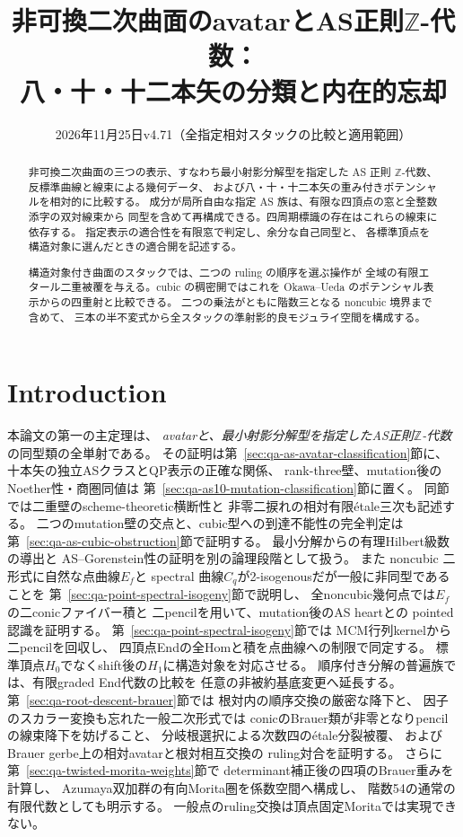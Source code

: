 \documentclass[a4paper,11pt]{ltjsarticle}
\title{非可換二次曲面のavatarとAS正則$\mathbb Z$-代数：\\
  八・十・十二本矢の分類と内在的忘却}
\author{}
\date{2026年11月25日\quad v4.71（全指定相対スタックの比較と適用範囲）}
\numberwithin{equation}{section}
\theoremstyle{plain}
\theoremstyle{definition}
\theoremstyle{remark}
\begin{document}
\maketitle
\begin{abstract}
非可換二次曲面の三つの表示、すなわち最小射影分解型を指定した
AS 正則 $\mathbb Z$-代数、反標準曲線と線束による幾何データ、
および八・十・十二本矢の重み付きポテンシャルを相対的に比較する。
成分が局所自由な指定 AS 族は、有限な四頂点の窓と全整数添字の双対線束から
同型を含めて再構成できる。四周期標識の存在はこれらの線束に依存する。
指定表示の適合性を有限窓で判定し、余分な自己同型と、
各標準頂点を構造対象に選んだときの適合開を記述する。

構造対象付き曲面のスタックでは、二つの ruling の順序を選ぶ操作が
全域の有限エタール二重被覆を与える。cubic の稠密開ではこれを
Okawa--Ueda のポテンシャル表示からの四重射と比較できる。
二つの乗法がともに階数三となる noncubic 境界まで含めて、
三本の半不変式から全スタックの準射影的良モジュライ空間を構成する。
\end{abstract}
\tableofcontents

\section{Introduction}
\label{sec:qa-introduction}

本論文の第一の主定理は、
\emph{avatarと、最小射影分解型を指定したAS正則$\mathbb Z$-代数}
の同型類の全単射である。
その証明は第~\ref{sec:qa-as-avatar-classification}節に、
十本矢の独立ASクラスとQP表示の正確な関係、
rank-three壁、mutation後のNoether性・商圏同値は
第~\ref{sec:qa-as10-mutation-classification}節に置く。
同節では二重壁のscheme-theoretic横断性と
非零二捩れの相対有限étale三次も記述する。
二つのmutation壁の交点と、cubic型への到達不能性の完全判定は
第~\ref{sec:qa-as-cubic-obstruction}節で証明する。
最小分解からの有理Hilbert級数の導出と
AS--Gorenstein性の証明を別の論理段階として扱う。
また noncubic 二形式に自然な点曲線$E_f$と
spectral 曲線$C_q$が2-isogenousだが一般に非同型であることを
第~\ref{sec:qa-point-spectral-isogeny}節で説明し、
全noncubic幾何点では$E_f$の二conicファイバー積と
二pencilを用いて、mutation後のAS heartとの
pointed認識を証明する。
第~\ref{sec:qa-point-spectral-isogeny}節では
MCM行列kernelから二pencilを回収し、
四頂点Endの全Homと積を点曲線への制限で同定する。
標準頂点$H_0$でなくshift後の$H_1$に構造対象を対応させる。
順序付き分解の普遍族では、有限graded End代数の比較を
任意の非被約基底変更へ延長する。
第~\ref{sec:qa-root-descent-brauer}節では
根対内の順序交換の厳密な降下と、
因子のスカラー変換も忘れた一般二次形式では
conicのBrauer類が非零となりpencilの線束降下を妨げること、
分岐根選択による次数四の\'{e}tale分裂被覆、
およびBrauer gerbe上の相対avatarと根対相互交換の
ruling対合を証明する。
さらに第~\ref{sec:qa-twisted-morita-weights}節で
determinant補正後の四項のBrauer重みを計算し、
Azumaya双加群の有向Morita圏を係数空間へ構成し、
階数54の通常の有限代数としても明示する。
一般点のruling交換は頂点固定Moritaでは実現できない。
\end{document}
